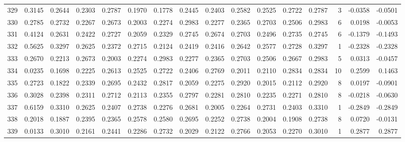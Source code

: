 \begin{tabular}{lrrrrrrrrrrrrrrr}
329 &      0.3145 &  0.2644 &  0.2303 &  0.2787 &  0.1970 &  0.1778 &  0.2445 &  0.2403 &  0.2582 &  0.2525 &   0.2722 &     0.2787 &      3 &                   -0.0358 &                    -0.0501 \\
330 &      0.2785 &  0.2732 &  0.2267 &  0.2673 &  0.2003 &  0.2274 &  0.2983 &  0.2277 &  0.2365 &  0.2703 &   0.2506 &     0.2983 &      6 &                    0.0198 &                    -0.0053 \\
331 &      0.4124 &  0.2631 &  0.2422 &  0.2727 &  0.2059 &  0.2329 &  0.2745 &  0.2674 &  0.2703 &  0.2496 &   0.2735 &     0.2745 &      6 &                   -0.1379 &                    -0.1493 \\
332 &      0.5625 &  0.3297 &  0.2625 &  0.2372 &  0.2715 &  0.2124 &  0.2419 &  0.2416 &  0.2642 &  0.2577 &   0.2728 &     0.3297 &      1 &                   -0.2328 &                    -0.2328 \\
333 &      0.2670 &  0.2213 &  0.2673 &  0.2003 &  0.2274 &  0.2983 &  0.2277 &  0.2365 &  0.2703 &  0.2506 &   0.2667 &     0.2983 &      5 &                    0.0313 &                    -0.0457 \\
334 &      0.0235 &  0.1698 &  0.2225 &  0.2613 &  0.2525 &  0.2722 &  0.2406 &  0.2769 &  0.2011 &  0.2110 &   0.2834 &     0.2834 &     10 &                    0.2599 &                     0.1463 \\
335 &      0.2723 &  0.1822 &  0.2339 &  0.2695 &  0.2432 &  0.2817 &  0.2059 &  0.2275 &  0.2920 &  0.2015 &   0.2112 &     0.2920 &      8 &                    0.0197 &                    -0.0901 \\
336 &      0.3028 &  0.2398 &  0.2311 &  0.2712 &  0.2113 &  0.2355 &  0.2797 &  0.2281 &  0.2810 &  0.2235 &   0.2271 &     0.2810 &      8 &                   -0.0218 &                    -0.0630 \\
337 &      0.6159 &  0.3310 &  0.2625 &  0.2407 &  0.2738 &  0.2276 &  0.2681 &  0.2005 &  0.2264 &  0.2731 &   0.2403 &     0.3310 &      1 &                   -0.2849 &                    -0.2849 \\
338 &      0.2018 &  0.1887 &  0.2395 &  0.2365 &  0.2578 &  0.2580 &  0.2695 &  0.2252 &  0.2738 &  0.2004 &   0.1908 &     0.2738 &      8 &                    0.0720 &                    -0.0131 \\
339 &      0.0133 &  0.3010 &  0.2161 &  0.2441 &  0.2286 &  0.2732 &  0.2029 &  0.2122 &  0.2766 &  0.2053 &   0.2270 &     0.3010 &      1 &                    0.2877 &                     0.2877 \\

\end{tabular}
